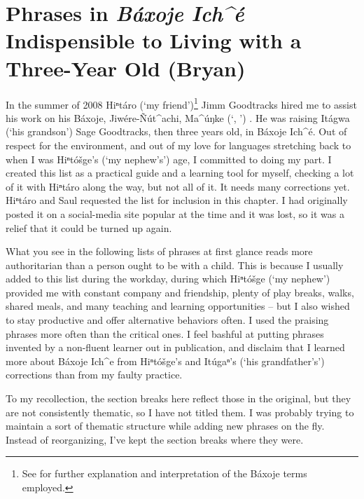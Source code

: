 \documentclass[output=paper]{LSP/langsci}
\begin{document}
\section{Phrases in \emph{Báxoje Ich\^{ }é} Indispensible to Living with a Three-Year Old (Bryan)}\label{bryan}
	In the summer of 2008 Hiⁿtáro (`my friend')\footnote{See  for further explanation and interpretation of the Báxoje  terms employed.} Jimm Goodtracks hired me to assist his work on his Báxoje, Jiwére-\~Nút\^{ }achi, Ma\^{ }úŋke (`, ') . He was raising Itágwa (`his grandson') Sage Goodtracks, then three years old, in Báxoje Ich\^{ }é. Out of respect for the  environment, and out of my love for languages stretching back to when I was Hiⁿtóšge's (`my nephew's') age, I committed to doing my part. I created this list as a practical guide and a learning tool for myself, checking a lot of it with Hiⁿtáro along the way, but not all of it. It needs many corrections yet. Hiⁿtáro and Saul requested the list for inclusion in this chapter. I had originally posted it on a social-media site popular at the time and it was lost, so it was a relief that it could be turned up again. 

What you see in the following lists of phrases
at first glance reads more authoritarian than a person ought to be with a child. This is because I usually added to this list during the workday, during which Hiⁿtóšge (`my nephew') provided me with constant company and friendship, plenty of play breaks, walks, shared meals, and many teaching and learning opportunities -- but I also wished to stay productive and offer alternative behaviors often. I used the praising phrases more often than the critical ones. I feel bashful at putting phrases invented by a non-fluent learner out in publication, and disclaim that I learned more about Báxoje Ich\^{ }e from Hiⁿtóšge's and Itúgaⁿ's (`his grandfather's') corrections than from my faulty practice. 

To my recollection, the section breaks here reflect those in the original, but they are not consistently thematic, so I have not titled them. I was probably trying to maintain a sort of thematic structure while adding new phrases on the fly. Instead of reorganizing, I've kept the section breaks where they were.

\end{document}
